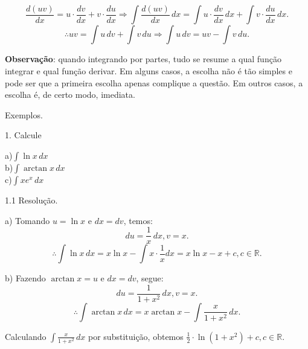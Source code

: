 \documentclass{article}
\begin{document}
{\begin{newpage}
\begin{equation*}\displaystyle{\frac{d(uv)}{dx} = u\cdot\frac{dv}{dx} + v\cdot\frac{du}{dx} \Rightarrow \int \frac{d(uv)}{dx}\, dx = \int u\cdot\frac{dv}{dx}\, dx + \int v\cdot\frac{du}{dx}\, dx}.\end{equation*}
$$\therefore \displaystyle{uv = \int u\, dv + \int v\, du \Rightarrow \int u\, dv = uv - \int v\, du}.$$
\par\textbf{Observação}: quando integrando por partes, tudo se resume a qual função integrar e qual função derivar. Em alguns casos, a escolha não é tão simples e pode ser que a primeira escolha apenas complique a questão. Em outros casos, a escolha é, de certo modo, imediata.
\par
\vspace{0.3cm}
Exemplos.
\par
\begin{flushleft}
1. Calcule
\end{flushleft}  
\par
\begin{multicols}{3}
\hspace{-15pt}a)$\displaystyle{\int \ln{x}\, dx}$\\
b)$\displaystyle{\int \arctan{x}\, dx}$\\
c)$\displaystyle{\int xe^{x}\, dx}$
\end{multicols}
\par
\vspace{0.3cm}
\begin{flushleft}
1.1 Resolução.
\end{flushleft}
\par
a) Tomando $u=\ln{x}$ e $dx=dv$, temos:
\begin{equation*}\displaystyle{du = \frac{1}{x}\, dx, v = x}.\end{equation*}
$$\therefore \displaystyle{\int \ln{x}\, dx = x\ln{x} - \int x\cdot\frac{1}{x} dx = x\ln{x} - x + c, c\in\mathbb{R}}.$$
\par
\vspace{0.3cm}
b) Fazendo $\arctan{x} = u$ e $dx = dv$, segue:
\begin{equation*} \displaystyle{du = \frac{1}{1+x^2}\, dx, v = x}.\end{equation*}
\begin{equation*}\therefore \displaystyle{\int \arctan{x}\, dx = x\arctan{x} - \int \frac{x}{1+x^2}\, dx }.\end{equation*}
\par Calculando $\displaystyle{\int \frac{x}{1+x^2}\, dx}$ por substituição, obtemos $\displaystyle{\frac{1}{2}\cdot\ln{(1 + x^2)} + c, c\in\mathbb{R}}$.

\end{newpage}}
\end{document}
